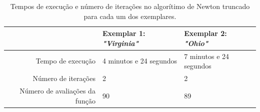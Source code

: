 \begin{table}
	\caption{Tempos de execução e número de iterações no algorítimo de Newton truncado para cada um dos exemplares.}
	\label{tab:temposexec2}
	\begin{tabular}{r || l | l}
		 & Exemplar 1: \emph{"Virginia"} & Exemplar 2: \emph{"Ohio"} \\ \hline
		Tempo de execução & 4 minutos e 24 segundos & 7 minutos e 24 segundos\\ \hline
		Número de iterações & 2 & 2 \\ \hline
		Número de avaliações da função & 90 & 89
	\end{tabular}
\end{table}


